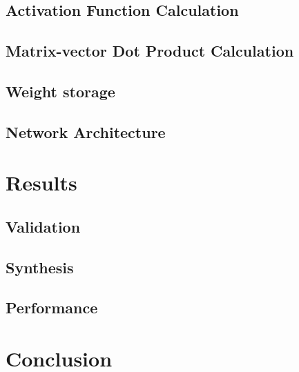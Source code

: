 \documentclass{IEEEtran}
\begin{document}
\subsection{Activation Function Calculation}

\subsection{Matrix-vector Dot Product Calculation}

\subsection{Weight storage}

\subsection{Network Architecture}

\section{Results}\label{sec:results}

\subsection{Validation}

\subsection{Synthesis}

\subsection{Performance}

\section{Conclusion}\label{sec:concl}

  
 
\end{document}
